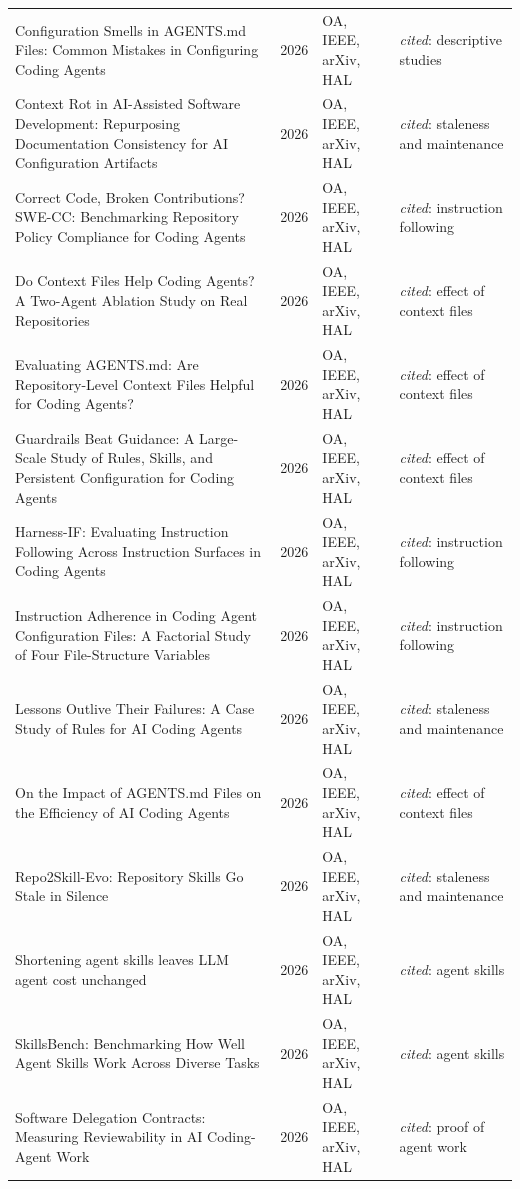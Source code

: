\begin{longtable}{@{}%
  >{\raggedright\arraybackslash}p{}c%
  >{\raggedright\arraybackslash}p{}%
  >{\raggedright\arraybackslash}p{}@{}}
Configuration Smells in AGENTS.md Files: Common Mistakes in Configuring Coding Agents & 2026 & OA, IEEE, arXiv, HAL & \emph{cited}: descriptive studies \\
Context Rot in AI-Assisted Software Development: Repurposing Documentation Consistency for AI Configuration Artifacts & 2026 & OA, IEEE, arXiv, HAL & \emph{cited}: staleness and maintenance \\
Correct Code, Broken Contributions? SWE-CC: Benchmarking Repository Policy Compliance for Coding Agents & 2026 & OA, IEEE, arXiv, HAL & \emph{cited}: instruction following \\
Do Context Files Help Coding Agents? A Two-Agent Ablation Study on Real Repositories & 2026 & OA, IEEE, arXiv, HAL & \emph{cited}: effect of context files \\
Evaluating AGENTS.md: Are Repository-Level Context Files Helpful for Coding Agents? & 2026 & OA, IEEE, arXiv, HAL & \emph{cited}: effect of context files \\
Guardrails Beat Guidance: A Large-Scale Study of Rules, Skills, and Persistent Configuration for Coding Agents & 2026 & OA, IEEE, arXiv, HAL & \emph{cited}: effect of context files \\
Harness-IF: Evaluating Instruction Following Across Instruction Surfaces in Coding Agents & 2026 & OA, IEEE, arXiv, HAL & \emph{cited}: instruction following \\
Instruction Adherence in Coding Agent Configuration Files: A Factorial Study of Four File-Structure Variables & 2026 & OA, IEEE, arXiv, HAL & \emph{cited}: instruction following \\
Lessons Outlive Their Failures: A Case Study of Rules for AI Coding Agents & 2026 & OA, IEEE, arXiv, HAL & \emph{cited}: staleness and maintenance \\
On the Impact of AGENTS.md Files on the Efficiency of AI Coding Agents & 2026 & OA, IEEE, arXiv, HAL & \emph{cited}: effect of context files \\
Repo2Skill-Evo: Repository Skills Go Stale in Silence & 2026 & OA, IEEE, arXiv, HAL & \emph{cited}: staleness and maintenance \\
Shortening agent skills leaves LLM agent cost unchanged & 2026 & OA, IEEE, arXiv, HAL & \emph{cited}: agent skills \\
SkillsBench: Benchmarking How Well Agent Skills Work Across Diverse Tasks & 2026 & OA, IEEE, arXiv, HAL & \emph{cited}: agent skills \\
Software Delegation Contracts: Measuring Reviewability in AI Coding-Agent Work & 2026 & OA, IEEE, arXiv, HAL & \emph{cited}: proof of agent work \\

\end{longtable}
